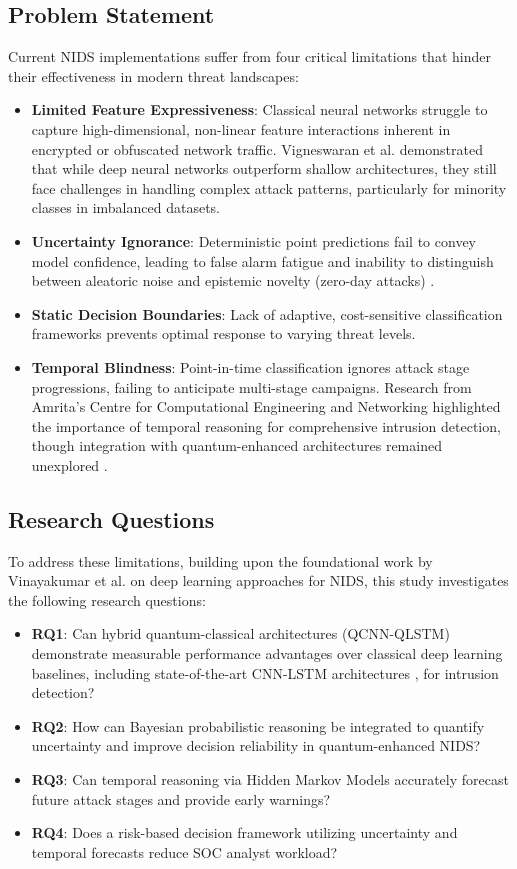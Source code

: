\documentclass[conference]{IEEEtran}
\begin{document}
\subsection{Problem Statement}
Current NIDS implementations suffer from four critical limitations that hinder their effectiveness in modern threat landscapes:
\begin{itemize}
    \item \textbf{Limited Feature Expressiveness}: Classical neural networks struggle to capture high-dimensional, non-linear feature interactions inherent in encrypted or obfuscated network traffic. Vigneswaran et al. \cite{vigneswaran2018evaluating} demonstrated that while deep neural networks outperform shallow architectures, they still face challenges in handling complex attack patterns, particularly for minority classes in imbalanced datasets.
    \item \textbf{Uncertainty Ignorance}: Deterministic point predictions fail to convey model confidence, leading to false alarm fatigue and inability to distinguish between aleatoric noise and epistemic novelty (zero-day attacks) \cite{ref9, ref10}.
    \item \textbf{Static Decision Boundaries}: Lack of adaptive, cost-sensitive classification frameworks prevents optimal response to varying threat levels.
    \item \textbf{Temporal Blindness}: Point-in-time classification ignores attack stage progressions, failing to anticipate multi-stage campaigns. Research from Amrita's Centre for Computational Engineering and Networking \cite{vigneswaran2020compendium} highlighted the importance of temporal reasoning for comprehensive intrusion detection, though integration with quantum-enhanced architectures remained unexplored \cite{ref20, ref21}.
\end{itemize}

\subsection{Research Questions}
To address these limitations, building upon the foundational work by Vinayakumar et al. \cite{vinayakumar2017rnn, vinayakumar2017applying} on deep learning approaches for NIDS, this study investigates the following research questions:
\begin{itemize}
    \item \textbf{RQ1}: Can hybrid quantum-classical architectures (QCNN-QLSTM) demonstrate measurable performance advantages over classical deep learning baselines, including state-of-the-art CNN-LSTM architectures \cite{vigneswaran2018evaluating}, for intrusion detection?
    \item \textbf{RQ2}: How can Bayesian probabilistic reasoning be integrated to quantify uncertainty and improve decision reliability in quantum-enhanced NIDS?
    \item \textbf{RQ3}: Can temporal reasoning via Hidden Markov Models accurately forecast future attack stages and provide early warnings?
    \item \textbf{RQ4}: Does a risk-based decision framework utilizing uncertainty and temporal forecasts reduce SOC analyst workload?
\end{itemize}
\end{document}
